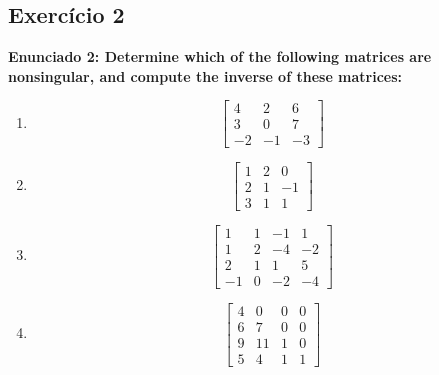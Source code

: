 \documentclass{article}
\begin{document}
\subsection*{Exerc\'icio 2}
\textbf{Enunciado 2: Determine which of the following matrices are nonsingular, and compute the inverse of these matrices:}

\begin{enumerate}
    \item
    \[
    \begin{bmatrix}
        4 &  2 &  6 \\
        3 &  0 &  7 \\
        -2 & -1 & -3
    \end{bmatrix}
    \]
    \item
    \[
    \begin{bmatrix}
        1 &  2 &  0 \\
        2 &  1 & -1 \\
        3 &  1 &  1
    \end{bmatrix}
    \]
    \item
    \[
    \begin{bmatrix}
        1 &  1 & -1 &  1 \\
        1 &  2 & -4 & -2 \\
        2 &  1 &  1 &  5 \\
        -1 &  0 & -2 & -4
    \end{bmatrix}
    \]
    \item
    \[
    \begin{bmatrix}
        4 & 0 & 0 & 0 \\
        6 & 7 & 0 & 0 \\
        9 & 11 & 1 & 0 \\
        5 & 4 & 1 & 1
    \end{bmatrix}
    \]
\end{enumerate}

\end{document}

